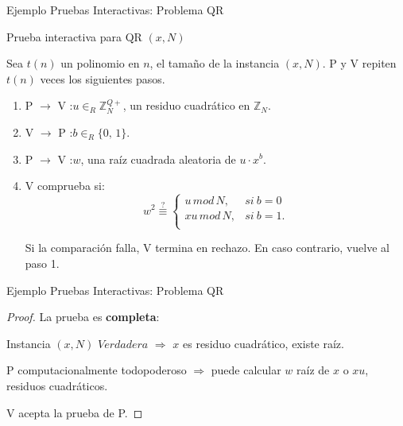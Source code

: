 \documentclass{beamer}
\begin{document}
\begin{frame}{Ejemplo Pruebas Interactivas: Problema QR}
\begin{block}{Prueba interactiva para QR $(x,N)$}
	
	Sea $t(n)$ un polinomio en $n$, el tamaño de la instancia $(x,N)$. P y V repiten $t(n)$ veces los siguientes pasos.
	
	\begin{enumerate}
		
		\item P $\rightarrow$ V :\quad $u \in_R \mathbb{Z}^{Q+}_N$, \; un residuo cuadrático en $\mathbb{Z}_N$.
		
		\item V $\rightarrow$ P :\quad $b \in_R \{0,\,1\}$.
		
		\item P $\rightarrow$ V :\quad $w$,\; una raíz cuadrada aleatoria de $u\cdot x^b$.
		
		\item V comprueba si:
		\[
		w^2 \overset{?}{\equiv}
		\begin{cases}
		u\, mod\, N, & si\ b = 0\\
		xu\, mod\, N, & si\ b = 1.\\
		\end{cases}
		\]
		
		Si la comparación falla, V termina en rechazo. En caso contrario, vuelve al paso 1.
		
	\end{enumerate}
	
\end{block}
\end{frame}


\begin{frame}{Ejemplo Pruebas Interactivas: Problema QR}
	\begin{proof}
		La prueba es \textbf{completa}:
		
		Instancia $(x,N)$ $Verdadera$ $\Rightarrow$ $x$ es residuo cuadrático, existe raíz.
		
		P computacionalmente todopoderoso $\Rightarrow$ puede calcular $w$ raíz de $x$ o $xu$, residuos cuadráticos.
		
		V acepta la prueba de P.
	\end{proof}
\end{frame}
\end{document}
